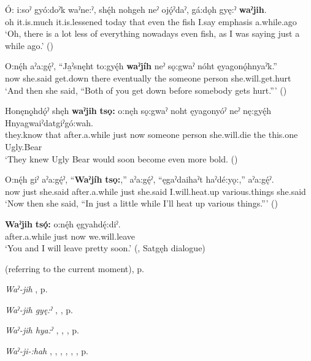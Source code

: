 \ea
\label{ex:wpart11}
\gll Ó: i:soˀ gyó:doˀk waˀne:ˀ, shę́h nohgeh neˀ ojǫ́ˀdaˀ, gá:dǫh gyę:ˀ \textbf{waˀjih}.\\
oh it.is.much it.is.lessened today that even the fish I.say emphasis a.while.ago\\
\glt ‘Oh, there is a lot less of everything nowadays even fish, as I was saying just a while ago.’ (\cite{mithun_how_1980})
\z


\ea
\label{ex:wpart12}
\gll O:nę́h aˀa:gę́ˀ, “Ja̱ˀsnęht to:gyę́h \textbf{waˀjíh} neˀ sǫ:gwaˀ nóht ęyagonǫ́hnyaˀk.”\\
now she.said get.down there eventually the someone person she.will.get.hurt\\
\glt ‘And then she said, “Both of you get down before somebody gets hurt.”’ (\cite{henry_de_2005})
\z


\ea
\label{ex:wpart13}
\gll Honęnǫ̱hdǫ́ˀ shęh \textbf{waˀjih} \textbf{tsǫ:} o:nęh sǫ:gwaˀ noht ęyagonyóˀ neˀ nę:gyę́h Hnyagwaiˀdatgiˀgó:wah.\\
they.know that after.a.while just now someone person she.will.die the this.one Ugly.Bear\\
\glt ‘They knew Ugly Bear would soon become even more bold. (\cite{carrier_legends_2013})
\z


\ea
\label{ex:wpart14}
\gll O:nę́h giˀ aˀa:gę́ˀ, “\textbf{Waˀjíh} \textbf{tsǫ:},” aˀa:gę́ˀ, “ęgaˀdaihaˀt haˀdé:yǫ:,” aˀa:gę́ˀ.\\
now just she.said after.a.while just she.said I.will.heat.up various.things she.said\\
\glt ‘Now then she said, “In just a little while I’ll heat up various things.”’ (\cite{henry_de_2005})
\z


\ea
\label{ex:wpart15}
\gll \textbf{Waˀjih} \textbf{tsǫ́:} o:nę́h ęgyahdę́:diˀ.\\
after.a.while just now we.will.leave\\
\glt ‘You and I will leave pretty soon.’ (\cite[142]{mithun_watewayestanih_1984}, Satgęh dialogue)
\z


\begin{CayugaRelated}
\item {} (referring to the current moment), p. \pageref{p:[waˀ-]}\\
\item \textit{Waˀ-jih} , p. \pageref{p:[waˀ-jih] ‘wait!’}\\
\item \textit{Waˀ-jih gyę:ˀ} , , p. \pageref{p:[waˀ-jih gyę:ˀ]}\\
\item \textit{Waˀ-jih hya:ˀ} , , , p. \pageref{p:[waˀ-jih hya:ˀ]}\\
\item \textit{Waˀ-ji-:hah} , , , , , , p. \pageref{p:[waˀ-ji-:hah]}
\end{CayugaRelated}


